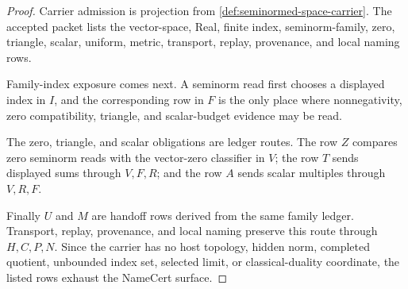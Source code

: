 \begin{proof}
Carrier admission is projection from \autoref{def:seminormed-space-carrier}. The accepted packet lists the vector-space, Real, finite index, seminorm-family, zero, triangle, scalar, uniform, metric, transport, replay, provenance, and local naming rows.

Family-index exposure comes next. A seminorm read first chooses a displayed index in $I$, and the corresponding row in $F$ is the only place where nonnegativity, zero compatibility, triangle, and scalar-budget evidence may be read.

The zero, triangle, and scalar obligations are ledger routes. The row $Z$ compares zero seminorm reads with the vector-zero classifier in $V$; the row $T$ sends displayed sums through $V,F,R$; and the row $A$ sends scalar multiples through $V,R,F$.

Finally $U$ and $M$ are handoff rows derived from the same family ledger. Transport, replay, provenance, and local naming preserve this route through $H,C,P,N$. Since the carrier has no host topology, hidden norm, completed quotient, unbounded index set, selected limit, or classical-duality coordinate, the listed rows exhaust the NameCert surface.
\end{proof}

